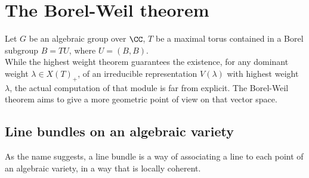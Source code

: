 \section{The Borel-Weil theorem}
Let $G$ be an algebraic group over $\CC$, $T$ be a maximal torus contained in a Borel subgroup $B = TU$, where $U = (B,B)$.\\
While the highest weight theorem guarantees the existence, for any dominant weight ${\lambda \in {X(T)}_+}$, of an irreducible representation $V(\lambda)$ with highest weight $\lambda$, the actual computation of that module is far from explicit. The Borel-Weil theorem aims to give a more geometric point of view on that vector space.

\subsection{Line bundles on an algebraic variety}
As the name suggests, a line bundle is a way of associating a line to each point of an algebraic variety, in a way that is locally coherent.
